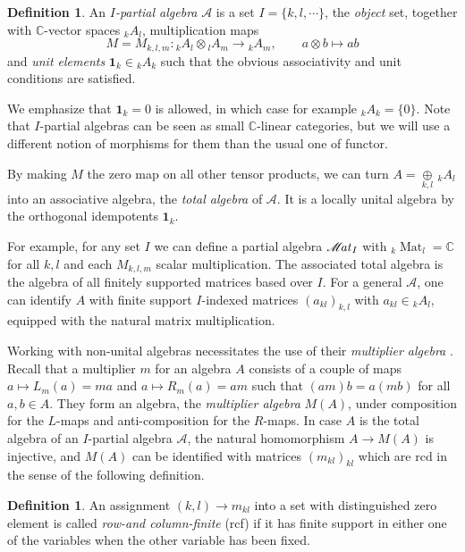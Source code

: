 \documentclass[10pt]{article}
\DeclareMathOperator{\Mat}{\mathscr{M}\!\it{at}}
\DeclareMathOperator{\Matt}{\mathrm{Mat}}
\newcommand{\C}{\mathbb{C}}
\newcommand{\GrDA}[3]{{}_{#2}#1_{#3}} %
\newcommand{\Unit}{\mathbf{1}}
\theoremstyle{definition}
\newtheorem{Def}[Theorem]{Definition}
\numberwithin{equation}{section}
\begin{document}
\begin{Def} An \emph{$I$-partial algebra} $\mathscr{A}$ is a set $I=\{k,l,\cdots\}$, the \emph{object} set, together with $\C$-vector spaces $\GrDA{A}{k}{l}$, multiplication maps \[M=M_{k,l,m}:\GrDA{A}{k}{l} \otimes \GrDA{A}{l}{m}\rightarrow \GrDA{A}{k}{m},\qquad a\otimes b \mapsto ab\]  and \emph{unit elements} $\Unit_k \in \GrDA{A}{k}{k}$ such that the obvious associativity and unit conditions are satisfied. 
\end{Def}

We emphasize that $\Unit_k=0$ is allowed, in which case for example $\GrDA{A}{k}{k}=\{0\}$. Note that $I$-partial algebras can be seen as small $\C$-linear categories, but we will use a different notion of morphisms for them than the usual one of functor.

By making $M$ the zero map on all other tensor products, we can turn $A =  \underset{k,l}{\oplus}\,\GrDA{A}{k}{l}$ into an associative algebra, the \emph{total algebra} of $\mathscr{A}$.  It is a locally unital algebra by the orthogonal idempotents $\mathbf{1}_k$. 

For example, for any set $I$ we can define a partial algebra $\Mat_I$ with $\GrDA{\Matt}{k}{l} = \C$ for all $k,l$ and each $M_{k,l,m}$ scalar multiplication. The associated total algebra is the algebra of all finitely supported matrices based over $I$. For a general $\mathscr{A}$, one can identify $A$ with finite support $I$-indexed matrices $(a_{kl})_{k,l}$ with $a_{kl} \in \GrDA{A}{k}{l}$, equipped with the natural matrix multiplication. 

Working with non-unital algebras necessitates the use of their \emph{multiplier algebra} \cite{Dau1,VDae1}. Recall that a multiplier $m$ for an algebra $A$ consists of a couple of maps $a \mapsto L_m(a)=ma$ and $a\mapsto R_m(a)=am$ such that $(am)b = a(mb)$ for all $a,b\in A$. They form an algebra, the \emph{multiplier algebra} $M(A)$, under composition for the $L$-maps and anti-composition for the $R$-maps. In case $A$ is the total algebra of an $I$-partial algebra $\mathscr{A}$, the natural homomorphism $A\rightarrow M(A)$ is injective, and $M(A)$ can be identified with matrices $(m_{kl})_{kl}$ which are rcd in the sense of the following definition.

\begin{Def} An assignment $(k,l)\rightarrow m_{kl}$ into a set with distinguished zero element is called \emph{row-and column-finite} (rcf) if it has finite support in either one of the variables when the other variable has been fixed. 
\end{Def} 
\end{document}
